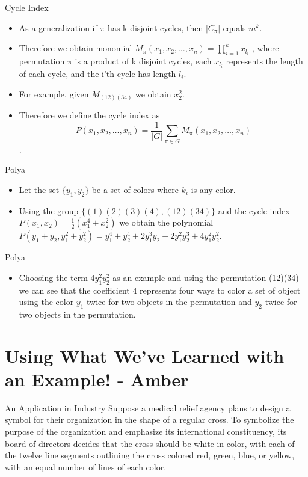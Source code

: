 \documentclass{beamer}
\begin{document}
\begin{frame}{Cycle Index}
\begin{itemize}
\item As a generalization if $\pi$ has k disjoint cycles, then $\vert C_{\pi}\vert$ equals $m^k$.
\item Therefore we obtain monomial $M_{\pi}(x_{1}, x_{2}, \ldots,x_{n}) = \displaystyle \prod_{i=1}^{k}x_{l_{i}}$ , where permutation $\pi$ is a product of k disjoint cycles, each $x_{l_{i}}$ represents the length of each cycle, and the i'th cycle has length $l_{i}$.
\item For example, given $M_{(12)(34)}$ we obtain $x_{2}^{2}$.
\item Therefore we define the cycle index as $$P(x_{1}, x_{2}, \ldots,x_{n})=\frac{1}{|G|}\sum_{\pi\in G}M_{\pi}(x_{1}, x_{2}, \ldots,x_{n})$$.
\end{itemize}
\end{frame}

%
%
\begin{frame}{Polya}
\begin{itemize}
\item Let the set $\{y_{1}, y_{2}\}$ be a set of colors where $k_{i}$ is any color.
\item Using the group $\{(1)(2)(3)(4), (12)(34)\}$ and the cycle index $P(x_{1},x_{2}) = \frac{1}{2}(x_{1}^{4} + x_{2}^{2})$ we obtain the polynomial $P(y_{1}+y_{2} , y_{1}^{2}+y_{2}^{2}) = y_{1}^{4} + y_{2}^{4} + 2y_{1}^{3}y_{2} + 2y_{1}^{2}y_{2}^{3} + 4y_{1}^{2}y_{2}^{2}$.
\end{itemize}
\end{frame}

%
%
\begin{frame}{Polya}
\begin{itemize}
\item Choosing the term $4y_{1}^{2}y_{2}^{2}$ as an example and using the permutation (12)(34) we can see that the coefficient 4 represents four ways to color a set of object using the color $y_{1}$ twice for two objects in the permutation and $y_{2}$ twice for two objects in the permutation.
\end{itemize}
\end{frame}
\section{Using What We've Learned with an Example! - Amber}

\begin{frame}{An Application in Industry}
	Suppose a medical relief agency plans to design a symbol for their organization in the shape of a regular cross. To symbolize the purpose of the organization and emphasize its international constituency, its board of directors decides that the cross should be white in color, with each of the twelve line segments outlining the cross colored red, green, blue, or yellow, with an equal number of lines of each color.
\end{frame}
\end{document}
